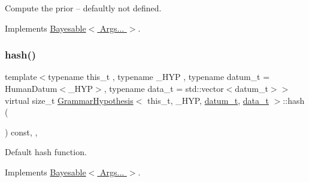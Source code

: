 Compute the prior -- defaultly not defined. 



Implements \hyperlink{class_bayesable_a1b057a17212ced123545133e2297c01b}{Bayesable$<$ Args... $>$}.

\mbox{\label{class_grammar_hypothesis_aeb9e858426a5ef273b87eafd8b2a5cd6}} 
\subsubsection{\texorpdfstring{hash()}{hash()}}
{\footnotesize\ttfamily template$<$typename this\+\_\+t , typename \+\_\+\+H\+YP , typename datum\+\_\+t  = Human\+Datum$<$\+\_\+\+H\+Y\+P$>$, typename data\+\_\+t  = std\+::vector$<$datum\+\_\+t$>$$>$ \\
virtual size\+\_\+t \hyperlink{class_grammar_hypothesis}{Grammar\+Hypothesis}$<$ this\+\_\+t, \+\_\+\+H\+YP, \hyperlink{class_bayesable_a9f1a6c0cd7855550fa10b1a8f13a5867}{datum\+\_\+t}, \hyperlink{class_bayesable_aa2788c4d7718c0a824e1d28c4c98f921}{data\+\_\+t} $>$\+::hash (\begin{DoxyParamCaption}{ }\end{DoxyParamCaption}) const\hspace{0.3cm}{\ttfamily [inline]}, {\ttfamily [override]}, {\ttfamily [virtual]}}



Default hash function. 



Implements \hyperlink{class_bayesable_a26f6d55e7526ebd897cbb27c757b611b}{Bayesable$<$ Args... $>$}.

\mbox{\label{class_grammar_hypothesis_a3fb4235ab47fe78e77c63023c22659d7}} 
